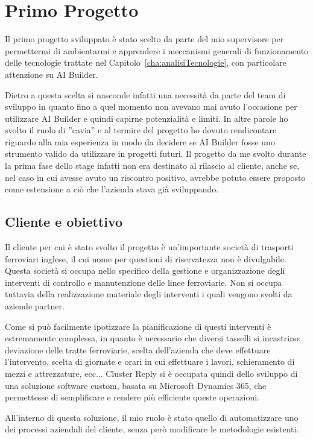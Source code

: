 \graphicspath{{./chapters/03/assets/}}

\chapter{Primo Progetto}
\label{cha:progetto1}
Il primo progetto sviluppato è stato scelto da parte del mio supervisore per permettermi di ambientarmi e apprendere i meccanismi generali di funzionamento delle tecnologie trattate nel Capitolo~\ref{cha:analisiTecnologie}, con particolare attenzione su AI Builder. 

Dietro a questa scelta si nasconde infatti una necessità da parte del team di sviluppo in quanto fino a quel momento non avevano mai avuto l'occasione per utilizzare AI Builder e quindi capirne potenzialità e limiti. In altre parole ho svolto il ruolo di ''cavia'' e al termire del progetto ho dovuto rendicontare riguardo alla mia esperienza in modo da decidere se AI Builder fosse uno strumento valido da utilizzare in progetti futuri. Il progetto da me svolto durante la prima fase dello stage infatti non era destinato al rilascio al cliente, anche se, nel caso in cui avesse avuto un riscontro positivo, avrebbe potuto essere proposto come estensione a ciò che l'azienda stava già sviluppando.

\section{Cliente e obiettivo}
Il cliente per cui è stato svolto il progetto è un'importante società di trasporti ferroviari inglese, il cui nome per questioni di riservatezza non è divulgabile. Questa società si occupa nello specifico della gestione e organizzazione degli interventi di controllo e manutenzione delle linee ferroviarie. Non si occupa tuttavia della realizzazione materiale degli interventi i quali vengono svolti da aziende partner.

Come si può facilmente ipotizzare la pianificazione di questi interventi è estremamente complessa, in quanto è necessario che diversi tasselli si incastrino: deviazione delle tratte ferroviarie, scelta dell'azienda che deve effettuare l'intervento, scelta di giornate e orari in cui effettuare i lavori, schieramento di mezzi e attrezzature, ecc...
Cluster Reply si è occupata quindi dello sviluppo di una soluzione software custom, basata su Microsoft Dynamics 365, che permettesse di semplificare e rendere più efficiente queste operazioni.

All'interno di questa soluzione, il mio ruolo è stato quello di automatizzare uno dei processi aziendali del cliente, senza però modificare le metodologie esistenti. 

